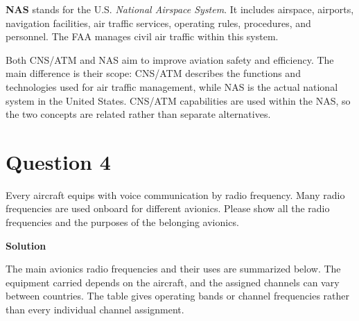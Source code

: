 \documentclass[12pt,a4paper]{article}
\begin{document}
\textbf{NAS} stands for the U.S. \emph{National Airspace System}. It includes
airspace, airports, navigation facilities, air traffic services, operating rules,
procedures, and personnel. The FAA manages civil air traffic within this
system.

Both CNS/ATM and NAS aim to improve aviation safety and efficiency. The main
difference is their scope: CNS/ATM describes the functions and technologies used
for air traffic management, while NAS is the actual national system in the United
States. CNS/ATM capabilities are used within the NAS, so the two concepts are related
rather than separate alternatives.

\newpage
\section*{Question 4}
Every aircraft equips with voice communication by radio frequency. Many radio frequencies are used onboard for different avionics. Please show all the radio frequencies and the purposes of the belonging avionics.

\textbf{Solution}

The main avionics radio frequencies and their uses are summarized below. The equipment
carried depends on the aircraft, and the assigned channels can vary between countries.
The table gives operating bands or channel frequencies rather than every individual
channel assignment.
\end{document}
